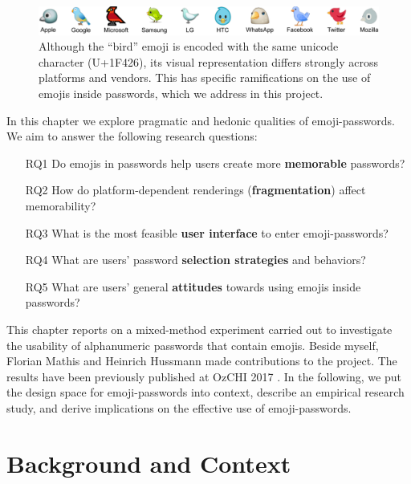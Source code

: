 \begin{figure}
	\centering
	\includegraphics[width=\linewidth]{figures/emojipasswords/emoji-bird-comparison}
	\caption{
		\label{fig:emojipasswords:emoji-bird-comparison}
		Although the ``bird'' emoji is encoded with the same unicode character (U+1F426), its visual representation differs strongly across platforms and vendors. This has specific ramifications on the use of emojis inside passwords, which we address in this project.
	}
\end{figure}

In this chapter we explore pragmatic and hedonic qualities of emoji-passwords. We aim to answer the following research questions:
\begin{itemize}
	\item[RQ1] Do emojis in passwords help users create more \textbf{memorable} passwords?
	\item[RQ2] How do platform-dependent renderings (\textbf{fragmentation}) affect memorability?
	\item[RQ3] What is the most feasible \textbf{user interface} to enter emoji-passwords?
	\item[RQ4] What are users' password \textbf{selection strategies} and behaviors?
	\item[RQ5] What are users' general \textbf{attitudes} towards using emojis inside passwords?
\end{itemize}

This chapter reports on a mixed-method experiment carried out to investigate the usability of alphanumeric passwords that contain emojis. Beside myself, Florian Mathis and Heinrich Hussmann made contributions to the project. The results have been previously published at OzCHI 2017 \cite{Seitz2017Emojipasswords}. In the following, we put the design space for emoji-passwords into context, describe an empirical research study, and derive implications on the effective use of emoji-passwords.

\section{Background and Context}

